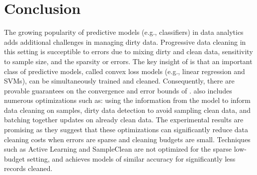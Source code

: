 \vspace{-1em}
\section{Conclusion}
The growing popularity of predictive models (e.g., classifiers) in data analytics adds additional challenges in managing dirty data.
Progressive data cleaning in this setting is succeptible to errors due to mixing dirty and clean data, sensitivity to sample size, and the sparsity or errors.
The key insight of \sys is that an important class of predictive models, called convex loss models (e.g., linear regression and SVMs), can be simultaneously trained and cleaned.
Consequently, there are provable guarantees on the convergence and error bounds of \sys.  
\sys also includes numerous optimizations such as: using the information from the model to inform data cleaning on samples, dirty data detection to avoid sampling clean data, and batching together updates on already clean data.
The experimental results are promising as they suggest that these optimizations can significantly reduce data cleaning costs when errors are sparse and cleaning budgets are small.
Techniques such as Active Learning and SampleClean are not optimized for the sparse low-budget setting, and \sys achieves models of similar accuracy for significantly less records cleaned.
